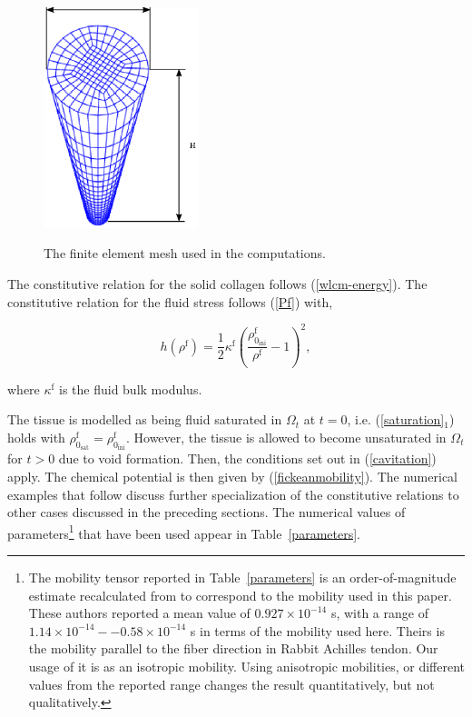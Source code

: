 \begin{figure}[!hpt]
  \centering
  {\includegraphics[width=0.4\textwidth]{images/examples/lagrangian/mesh}}
  \caption{The finite element mesh used in the computations.}
  \label{egmesh}
\end{figure}

The constitutive relation for the solid collagen follows
(\ref{wlcm-energy}). The constitutive relation for the fluid stress
follows (\ref{Pf}) with,

\begin{equation}
h(\rho^\mathrm{f}) =
\frac{1}{2}\kappa^\mathrm{f}\left(
\frac{\rho_{0_\mathrm{ini}}^\mathrm{f}}{\rho^\mathrm{f}}
- 1\right)^2,
\end{equation}

\noindent where $\kappa^\mathrm{f}$ is the fluid bulk modulus.

The
tissue is modelled as being fluid saturated in $\Omega_t$ at $t = 0$,
i.e. (\ref{saturation}$_1$) holds with
$\rho^\mathrm{f}_{0_\mathrm{sat}} =
\rho^\mathrm{f}_{0_\mathrm{ini}}$. However, the tissue is allowed to 
become unsaturated in $\Omega_t$ for $t > 0$ due to void formation. Then,
the conditions set out in (\ref{cavitation})
apply. The chemical potential is then given by
(\ref{fickeanmobility}). The numerical examples that follow discuss further
specialization of the constitutive relations to other cases discussed
in the preceding sections. The numerical values of parameters\footnote{The
  mobility tensor reported in Table~\ref{parameters} is an
  order-of-magnitude estimate 
  recalculated from \citet{Hanetal:2000} to correspond to the 
  mobility used in this paper. These authors reported a mean value of
  $0.927\times 10^{-14}$ s, with a range of $1.14\times
  10^{-14}--0.58\times 10^{-14}$ s in terms of the mobility used
  here. Theirs is the mobility parallel to the fiber direction in
  Rabbit Achilles tendon. Our usage of it is as an isotropic
  mobility. Using anisotropic mobilities, or different values from the
  reported range changes the result
  quantitatively, but not qualitatively.}  that
have been used appear in Table~\ref{parameters}.




